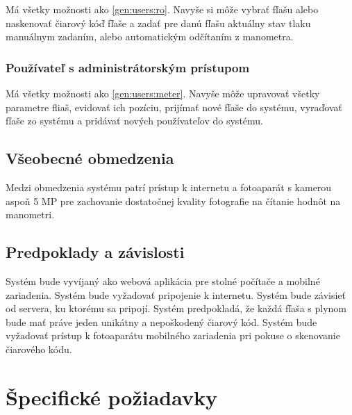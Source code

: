 \documentclass[hreffootnote]{zah}
\begin{document}
Má všetky možnosti ako \ref{gen:users:ro}. Navyše si môže vybrať fľašu alebo naskenovať čiarový kóď fľaše a zadať pre danú fľašu aktuálny stav tlaku manuálnym zadaním, alebo automatickým odčítaním z manometra.

\subsubsection{Používateľ s administrátorským prístupom}
\label{gen:users:admin}

Má všetky možnosti ako \ref{gen:users:meter}. Navyše môže upravovať všetky parametre fliaš, evidovať ich pozíciu, prijímať nové fľaše do systému, vyraďovať fľaše zo systému a pridávať nových používateľov do systému.

\subsection{Všeobecné obmedzenia}
\label{gen:constraints}

Medzi obmedzenia systému patrí prístup k internetu a fotoaparát s kamerou aspoň 5 MP pre zachovanie dostatočnej kvality fotografie na čítanie hodnôt na manometri. 

\subsection{Predpoklady a závislosti}
\label{gen:deps}

Systém bude vyvíjaný ako webová aplikácia pre stolné počítače a mobilné zariadenia. Systém bude vyžadovať pripojenie k internetu. Systém bude závisieť od servera, ku ktorému sa pripojí. Systém predpokladá, že každá fľaša s plynom bude mať práve jeden unikátny a nepoškodený čiarový kód. Systém bude vyžadovať prístup k fotoaparátu mobilného zariadenia pri pokuse o skenovanie čiarového kódu.

\cleardoublepage
\section{Špecifické požiadavky}
\end{document}
